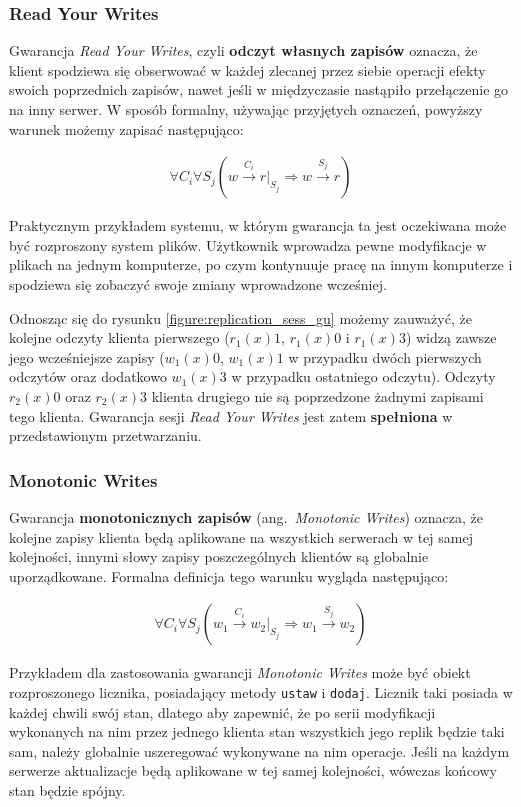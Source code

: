 \subsubsection{Read Your Writes}

Gwarancja \textit{Read Your Writes}, czyli \textbf{odczyt własnych zapisów} oznacza, że klient spodziewa się obserwować w każdej zlecanej przez siebie operacji efekty swoich poprzednich zapisów, nawet jeśli w międzyczasie nastąpiło przełączenie go na inny serwer. W sposób formalny, używając przyjętych oznaczeń, powyższy warunek możemy zapisać następująco:

\begin{align*}
    \forall{C_i} \forall{S_j} (w \xrightarrow{C_i} r|_{S_j} \Rightarrow w \xrightarrow{S_j} r)
\end{align*}

Praktycznym przykładem systemu, w którym gwarancja ta jest oczekiwana może być rozproszony system plików. Użytkownik wprowadza pewne modyfikacje w plikach na jednym komputerze, po czym kontynuuje pracę na innym komputerze i spodziewa się zobaczyć swoje zmiany wprowadzone wcześniej.

Odnosząc się do rysunku \ref{figure:replication_sess_gu} możemy zauważyć, że kolejne odczyty klienta pierwszego ($ r_1(x)1 $, $ r_1(x)0 $ i $ r_1(x)3 $) widzą zawsze jego wcześniejsze zapisy ($ w_1(x)0 $, $ w_1(x)1 $ w przypadku dwóch pierwszych odczytów oraz dodatkowo $ w_1(x)3 $ w przypadku ostatniego odczytu).
Odczyty $ r_2(x)0 $ oraz $ r_2(x)3 $ klienta drugiego nie są poprzedzone żadnymi zapisami tego klienta. Gwarancja sesji \textit{Read Your Writes} jest zatem \textbf{spełniona} w przedstawionym przetwarzaniu.

\subsubsection{Monotonic Writes}

Gwarancja \textbf{monotonicznych zapisów} (ang.\ \textit{Monotonic Writes}) oznacza, że kolejne zapisy klienta będą aplikowane na wszystkich serwerach w tej samej kolejności, innymi słowy zapisy poszczególnych klientów są globalnie uporządkowane. Formalna definicja tego warunku wygląda następująco:

\begin{align*}
    \forall{C_i} \forall{S_j} (w_1 \xrightarrow{C_i} w_2|_{S_j} \Rightarrow w_1 \xrightarrow{S_j} w_2)
\end{align*}

Przykładem dla zastosowania gwarancji \textit{Monotonic Writes} może być obiekt rozproszonego licznika, posiadający metody \texttt{ustaw} i \texttt{dodaj}. Licznik taki posiada w każdej chwili swój stan, dlatego aby zapewnić, że po serii modyfikacji wykonanych na nim przez jednego klienta stan wszystkich jego replik będzie taki sam, należy globalnie uszeregować wykonywane na nim operacje. Jeśli na każdym serwerze aktualizacje będą aplikowane w tej samej kolejności, wówczas końcowy stan będzie spójny.

